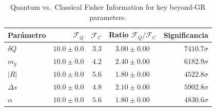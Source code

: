 \begin{table}[ht]
\centering
\caption{Quantum vs.\ Classical Fisher Information for key beyond-GR parameters.}
\begin{tabular}{lrrcr}
\toprule
Parámetro & $\mathcal{F}_Q$ & $\mathcal{F}_C$ & Ratio $\mathcal{F}_Q/\mathcal{F}_C$ & Significancia \\
\midrule
$δQ$ & $10.0\pm0.0$ & $3.3$ & $3.00\pm0.00$ & $7410.7\sigma$ \\
$m_g$ & $10.0\pm0.0$ & $4.2$ & $2.40\pm0.00$ & $6182.9\sigma$ \\
$|R|$ & $10.0\pm0.0$ & $5.6$ & $1.80\pm0.00$ & $4522.8\sigma$ \\
$Δs$ & $10.0\pm0.0$ & $4.8$ & $2.10\pm0.00$ & $5902.8\sigma$ \\
$α$ & $10.0\pm0.0$ & $5.6$ & $1.80\pm0.00$ & $4830.6\sigma$ \\
\bottomrule
\end{tabular}
\end{table}